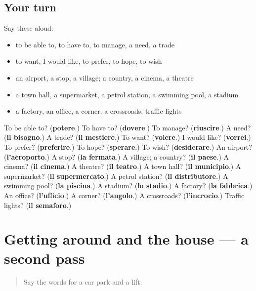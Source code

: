 \subsection*{Your turn}
Say these aloud:

\begin{itemize}
\raggedright
  \item to be able to, to have to, to manage, a need, a trade
  \item to want, I would like, to prefer, to hope, to wish
  \item an airport, a stop, a village; a country, a cinema, a theatre
  \item a town hall, a supermarket, a petrol station, a swimming pool, a stadium
  \item a factory, an office, a corner, a crossroads, traffic lights
\end{itemize}

\begin{tcolorbox}[breakable,colback=teal!4,colframe=teal!35!black,title={Before you move on}]
To be able to? (\textbf{potere}.) To have to? (\textbf{dovere}.) To manage? (\textbf{riuscire}.) A need? (\textbf{il bisogno}.) A trade? (\textbf{il mestiere}.) To want? (\textbf{volere}.) I would like? (\textbf{vorrei}.) To prefer? (\textbf{preferire}.) To hope? (\textbf{sperare}.) To wish? (\textbf{desiderare}.) An airport? (\textbf{l'aeroporto}.) A stop? (\textbf{la fermata}.) A village; a country? (\textbf{il paese}.) A cinema? (\textbf{il cinema}.) A theatre? (\textbf{il teatro}.) A town hall? (\textbf{il municipio}.) A supermarket? (\textbf{il supermercato}.) A petrol station? (\textbf{il distributore}.) A swimming pool? (\textbf{la piscina}.) A stadium? (\textbf{lo stadio}.) A factory? (\textbf{la fabbrica}.) An office? (\textbf{l'ufficio}.) A corner? (\textbf{l'angolo}.) A crossroads? (\textbf{l'incrocio}.) Traffic lights? (\textbf{il semaforo}.)
\end{tcolorbox}
\section[(dialogue)]{Getting around and the house — a second pass}

\label{lesson:IT-R95-second-pass-getting-around-and-the-house}



\begin{quote}
Say the words for a car park and a lift.
\end{quote}

